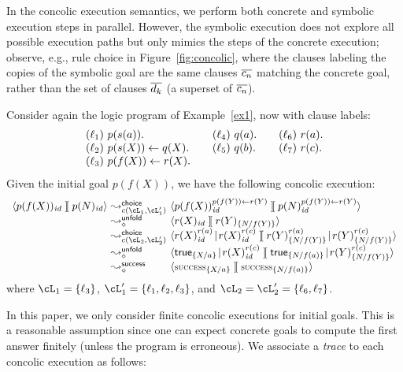 \documentclass[fleqn]{tlp}
\newcommand{\id}{{\mathit{id}}}
\newcommand{\midd}{\!\mid\!}
\newcommand{\sep}{\mathit{\;]\![\;}}
\newcommand{\success}{\mbox{\footnotesize \textsc{success}}}
\def \tuple#1{\langle #1 \rangle}
\begin{document}
In the concolic execution semantics, we perform both concrete and
symbolic execution steps in parallel. However, the symbolic execution
does not explore all possible execution paths but only mimics the
steps of the concrete execution; observe, e.g., rule \textsf{choice}
in Figure~\ref{fig:concolic}, where the clauses labeling the copies of
the symbolic goal are the same clauses $\overline{c_n}$ matching the
concrete goal, rather than the set of clauses $\overline{d_k}$ (a superset
of $\overline{c_n}$).

\begin{example} \label{ex2} 
  Consider again the logic program of Example~\ref{ex1}, now with
  clause labels:
  \[
  \begin{array}{l@{~~~~~~}l@{~~~~~~}l}
    (\ell_1)~ p(s(a)). &
    (\ell_4)~ q(a).   &
    (\ell_6)~ r(a).  \\
  
    (\ell_2)~ p(s(X)) \leftarrow q(X). & (\ell_5)~ q(b). & (\ell_7)~ r(c). \\
    
    (\ell_3)~ p(f(X)) \leftarrow r(X). & \\
    \end{array}
    \]
    Given the initial goal $p(f(X))$, we have the following concolic
    execution:
    \[
    \begin{array}{l@{~}l@{~}llll}
      \tuple{p(f(X))_\id\sep p(N)_\id} & \leadsto^\mathsf{choice}_{c(\cL_1,\cL'_1)} &
      \tuple{p(f(X))_\id^{p(f(Y)) \leftarrow r(Y)}\sep
        p(N)_\id^{p(f(Y)) \leftarrow r(Y)}} \\
      & \leadsto^\mathsf{unfold}_\diamond & \tuple{r(X)_\id\sep r(Y)_{\{N/f(Y)\}}} \\
      & \leadsto^\mathsf{choice}_{c(\cL_2,\cL'_2)} & \tuple{r(X)_\id^{r(a)}\midd
        r(X)_\id^{r(c)}\sep r(Y)_{\{N/f(Y)\}}^{r(a)}\midd
        r(Y)_{\{N/f(Y)\}}^{r(c)}} \\
      & \leadsto^\mathsf{unfold}_\diamond & \tuple{\mathsf{true}_{\{X/a\}}\midd
        r(X)_\id^{r(c)} \sep \mathsf{true}_{\{N/f(a)\}}\midd r(Y)_{\{N/f(Y)\}}^{r(c)}} \\
      & \leadsto^\mathsf{success}_\diamond & \tuple{\success_{\{X/a\}}\sep \success_{\{N/f(a)\}}} 
    \end{array}
    \]
    where $\cL_1 = \{\ell_3\}$, $\cL'_1=\{\ell_1,\ell_2,\ell_3\}$, and
    $\cL_2 = \cL'_2 = \{\ell_6,\ell_7\}$.
\end{example}
In this paper, we only consider finite concolic executions for initial
goals.  This is a reasonable assumption since one can expect concrete
goals to compute the first answer finitely (unless the program is
erroneous).
We associate a \emph{trace} to each concolic execution as follows:
\end{document}
